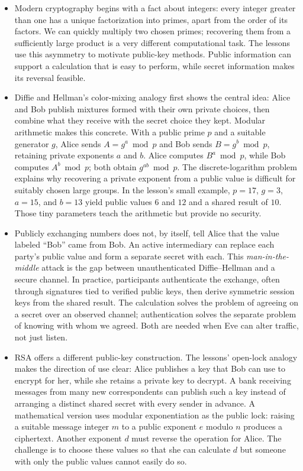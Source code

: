 \documentclass[10pt]{article}
\begin{document}
\begin{itemize}[leftmargin=1.25em, itemsep=0.3em, parsep=0pt, topsep=0pt]
    \item Modern cryptography begins with a fact about integers: every integer greater than one has a unique factorization into primes, apart from the order of its factors. We can quickly multiply two chosen primes; recovering them from a sufficiently large product is a very different computational task. The lessons use this asymmetry to motivate public-key methods. Public information can support a calculation that is easy to perform, while secret information makes its reversal feasible.

    \item Diffie and Hellman's color-mixing analogy first shows the central idea: Alice and Bob publish mixtures formed with their own private choices, then combine what they receive with the secret choice they kept. Modular arithmetic makes this concrete. With a public prime \(p\) and a suitable generator \(g\), Alice sends \(A=g^a\bmod p\) and Bob sends \(B=g^b\bmod p\), retaining private exponents \(a\) and \(b\). Alice computes \(B^a\bmod p\), while Bob computes \(A^b\bmod p\); both obtain \(g^{ab}\bmod p\). The discrete-logarithm problem explains why recovering a private exponent from a public value is difficult for suitably chosen large groups. In the lesson's small example, \(p=17\), \(g=3\), \(a=15\), and \(b=13\) yield public values \(6\) and \(12\) and a shared result of \(10\). Those tiny parameters teach the arithmetic but provide no security.

    \item Publicly exchanging numbers does not, by itself, tell Alice that the value labeled ``Bob'' came from Bob. An active intermediary can replace each party's public value and form a separate secret with each. This \textit{man-in-the-middle} attack is the gap between unauthenticated Diffie--Hellman and a secure channel. In practice, participants authenticate the exchange, often through signatures tied to verified public keys, then derive symmetric session keys from the shared result. The calculation solves the problem of agreeing on a secret over an observed channel; authentication solves the separate problem of knowing with whom we agreed. Both are needed when Eve can alter traffic, not just listen.

    \item RSA offers a different public-key construction. The lessons' open-lock analogy makes the direction of use clear: Alice publishes a key that Bob can use to encrypt for her, while she retains a private key to decrypt. A bank receiving messages from many new correspondents can publish such a key instead of arranging a distinct shared secret with every sender in advance. A mathematical version uses modular exponentiation as the public lock: raising a suitable message integer \(m\) to a public exponent \(e\) modulo \(n\) produces a ciphertext. Another exponent \(d\) must reverse the operation for Alice. The challenge is to choose these values so that she can calculate \(d\) but someone with only the public values cannot easily do so.


\end{itemize}
\end{document}
